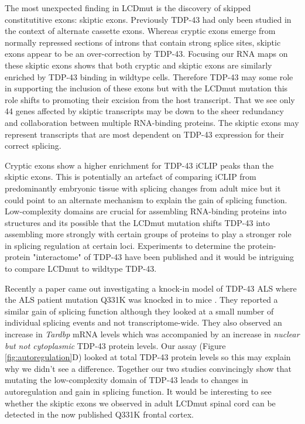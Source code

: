 The most unexpected finding in LCDmut is the discovery of skipped constitutitive exons: skiptic exons. 
Previously TDP-43 had only been studied in the context of alternate cassette exons.
Whereas cryptic exons emerge from normally repressed sections of introns that contain strong splice sites, skiptic exons appear to be an over-correction by TDP-43.
Focusing our RNA maps on these skiptic exons shows that both cryptic and skiptic exons are similarly enriched by TDP-43 binding in wildtype cells.
Therefore TDP-43 may some role in supporting the inclusion of these exons but with the LCDmut mutation this role shifts to promoting their excision from the host transcript.
That we see only 44 genes affected by skiptic transcripts may be down to the sheer redundancy and collaboration between multiple RNA-binding proteins. 
The skiptic exons may represent transcripts that are most dependent on TDP-43 expression for their correct splicing. 

Cryptic exons show a higher enrichment for TDP-43 iCLIP peaks than the skiptic exons. 
This is potentially an artefact of comparing iCLIP from predominantly embryonic tissue with splicing changes from adult mice but it could point to an alternate mechanism to explain the gain of splicing function.
Low-complexity domains are crucial for assembling RNA-binding proteins into structures  \cite{Gueroussov2017} and its possible that the LCDmut mutation shifts TDP-43 into assembling more strongly with certain groups of proteins to play a stronger role in splicing regulation at certain loci. 
Experiments to determine the protein-protein "interactome" of TDP-43 have been published \citep{Freibaum2010-hw} and it would be intriguing to compare LCDmut to wildtype TDP-43. 

Recently a paper came out investigating a knock-in model of TDP-43 ALS where the ALS patient mutation Q331K was knocked in to mice \citep{White2018}. 
They reported a similar gain of splicing function although they looked at a small number of individual splicing events and not transcriptome-wide.
They also observed an increase in \textit{Tardbp} mRNA levels which was accompanied by an increase in \textit{nuclear but not cytoplasmic} TDP-43 protein levels.
Our assay (Figure \ref{fig:autoregulation}D) looked at total TDP-43 protein levels so this may explain why we didn't see a difference. 
Together our two studies convincingly show that mutating the low-complexity domain of TDP-43 leads to changes in autoregulation and gain in splicing function.
It would be interesting to see whether the skiptic exons we observed in adult LCDmut spinal cord can be detected in the now published Q331K frontal cortex.
 
